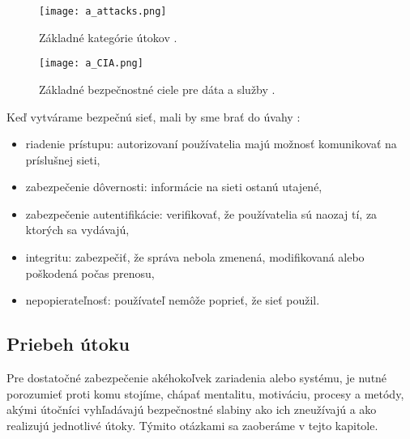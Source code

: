 \documentclass[12pt,a4paper,oneside,openright]{report}
\begin{document}
\begin{figure*}[h]
	\centering
	\texttt{[image: a\_attacks.png]}
	\caption{Základné kategórie útokov \cite{StallingsCryptographyandnetworksecurity}.}
	\label{f:o_attacks}
\end{figure*}

\begin{figure*}[h]
	\centering
	\texttt{[image: a\_CIA.png]}
	\caption{Základné bezpečnostné ciele pre dáta a služby \cite{StallingsCryptographyandnetworksecurity}.}
	\label{f:o_cia}
\end{figure*}

Keď vytvárame bezpečnú sieť, mali by sme brať do úvahy \cite{bidgoli2006handbook}:
\singlespacing
\begin{itemize}
\item riadenie prístupu: autorizovaní používatelia majú možnosť komunikovať na príslušnej sieti, 
\item zabezpečenie dôvernosti: informácie na sieti ostanú utajené, 
\item zabezpečenie autentifikácie: verifikovať, že používatelia sú naozaj tí, za ktorých sa vydávajú,
\item integritu: zabezpečiť, že správa nebola zmenená, modifikovaná alebo poškodená počas prenosu,
\item nepopierateľnosť: používateľ nemôže poprieť, že sieť použil.
\end{itemize}
\onehalfspacing

%


\subsection{Priebeh útoku} \label{s_attack}
Pre dostatočné zabezpečenie akéhokoľvek zariadenia alebo systému, je nutné porozumieť proti komu stojíme, chápať mentalitu, motiváciu, procesy a metódy, akými útočníci vyhľadávajú bezpečnostné slabiny ako ich zneužívajú a ako realizujú jednotlivé útoky. Týmito otázkami sa zaoberáme v tejto kapitole.
\end{document}
